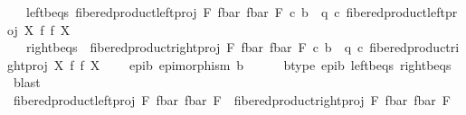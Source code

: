 \begin{isabellebody}
\ \ \ left{\isacharunderscore}{\kern0pt}b{\isacharunderscore}{\kern0pt}eqs{\isacharcolon}{\kern0pt}\ {\isachardoublequoteopen}fibered{\isacharunderscore}{\kern0pt}product{\isacharunderscore}{\kern0pt}left{\isacharunderscore}{\kern0pt}proj\ F\ {\isacharparenleft}{\kern0pt}f{\isacharunderscore}{\kern0pt}bar{\isacharparenright}{\kern0pt}\ {\isacharparenleft}{\kern0pt}f{\isacharunderscore}{\kern0pt}bar{\isacharparenright}{\kern0pt}\ F\ {\isasymcirc}\isactrlsub c\ b\ {\isacharequal}{\kern0pt}\ q\ {\isasymcirc}\isactrlsub c\ fibered{\isacharunderscore}{\kern0pt}product{\isacharunderscore}{\kern0pt}left{\isacharunderscore}{\kern0pt}proj\ X\ f\ f\ X{\isachardoublequoteclose}\ \isanewline
\ \ \ right{\isacharunderscore}{\kern0pt}b{\isacharunderscore}{\kern0pt}eqs{\isacharcolon}{\kern0pt}\ \ {\isachardoublequoteopen}fibered{\isacharunderscore}{\kern0pt}product{\isacharunderscore}{\kern0pt}right{\isacharunderscore}{\kern0pt}proj\ F\ {\isacharparenleft}{\kern0pt}f{\isacharunderscore}{\kern0pt}bar{\isacharparenright}{\kern0pt}\ {\isacharparenleft}{\kern0pt}f{\isacharunderscore}{\kern0pt}bar{\isacharparenright}{\kern0pt}\ F\ {\isasymcirc}\isactrlsub c\ b\ {\isacharequal}{\kern0pt}\ q\ {\isasymcirc}\isactrlsub c\ fibered{\isacharunderscore}{\kern0pt}product{\isacharunderscore}{\kern0pt}right{\isacharunderscore}{\kern0pt}proj\ X\ f\ f\ X{\isachardoublequoteclose}\ \isanewline
\ \ \ epi{\isacharunderscore}{\kern0pt}b{\isacharcolon}{\kern0pt}\ {\isachardoublequoteopen}epimorphism\ b{\isachardoublequoteclose}\isanewline
\ \ \ \ \isamarkupfalse%
\ b{\isacharunderscore}{\kern0pt}type\ epi{\isacharunderscore}{\kern0pt}b\ left{\isacharunderscore}{\kern0pt}b{\isacharunderscore}{\kern0pt}eqs\ right{\isacharunderscore}{\kern0pt}b{\isacharunderscore}{\kern0pt}eqs\ \isamarkupfalse%
\ blast\isanewline
\ \ \isanewline
\ \isanewline
\ \ \isamarkupfalse%
\ {\isachardoublequoteopen}fibered{\isacharunderscore}{\kern0pt}product{\isacharunderscore}{\kern0pt}left{\isacharunderscore}{\kern0pt}proj\ F\ {\isacharparenleft}{\kern0pt}f{\isacharunderscore}{\kern0pt}bar{\isacharparenright}{\kern0pt}\ {\isacharparenleft}{\kern0pt}f{\isacharunderscore}{\kern0pt}bar{\isacharparenright}{\kern0pt}\ F\ {\isacharequal}{\kern0pt}\ fibered{\isacharunderscore}{\kern0pt}product{\isacharunderscore}{\kern0pt}right{\isacharunderscore}{\kern0pt}proj\ F\ {\isacharparenleft}{\kern0pt}f{\isacharunderscore}{\kern0pt}bar{\isacharparenright}{\kern0pt}\ {\isacharparenleft}{\kern0pt}f{\isacharunderscore}{\kern0pt}bar{\isacharparenright}{\kern0pt}\ F{\isachardoublequoteclose}\isanewline

\end{isabellebody}
